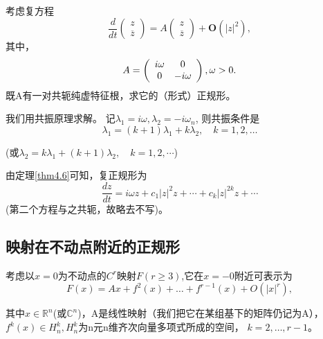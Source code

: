 \begin{example}
  考虑复方程
  \[
    \frac { d } { d t }
    \left(
      \begin{array} { l }
        { z } \\
        { \overline{z} }
      \end{array}
    \right)
    =    A \left(
      \begin{array} { l }
        { z } \\
        { \overline{z} }
      \end{array}
    \right)
  +\mathbf{O}\left(|z|^2\right),
\]
其中，
\[
  A = \left(
    \begin{array} { c c }
      { i \omega } & { 0 } \\
      { 0 } & { - i \omega }
    \end{array}
  \right),
  \omega > 0.
\]
既A有一对共轭纯虚特征根，求它的（形式）正规形。
\end{example}

\begin{solve}
  我们用共振原理求解。
  记$\lambda _ { 1 } = i \omega , \lambda _ { 2 } = - i \omega _ { n }$,
  则共振条件是
  \[
\lambda _ { 1 } = ( k + 1 ) \lambda _ { 1 } + k \lambda _ { 2 } , \quad k = 1,2 , \dots
\]

\begin{center}
(或$\lambda _ { 2 } = k \lambda _ { 1 } + ( k + 1 ) \lambda _ { 2 } , \quad k = 1,2 , \cdots$)
\end{center}
由定理\ref{thm4.6}可知，复正规形为
\begin{equation}
\frac { d z } { d t } = i \omega z + c _ { 1 } | z | ^ { 2 } z + \cdots + c _ { k } | z | ^ { 2k } z + \cdots
  \label{eq:1.4.22}
\end{equation}
(第二个方程与之共轭，故略去不写)。
\end{solve}

\subsection{映射在不动点附近的正规形}
考虑以\(x=0\)为不动点的\(C^r\)映射$F ( r \geq 3 )$,它在\(x=-0\)附近可表示为
\begin{equation}
F ( x ) = A x + f ^ { 2 } ( x ) + \dots + f ^ { r - 1 } ( x ) + O \left( | x | ^ { r } \right),
  \label{eq:1.4.23}
\end{equation}

其中\(x\in \mathbb{R}^n\)(或\(\mathbb{C}^n\))，A是线性映射（我们把它在某组基下的矩阵仍记为A），$f ^ { k } ( x ) \in H _ { n  } ^ { k } , H _ {  n  } ^ { k }$为n元n维齐次向量多项式所成的空间，
$k = 2 , \dots , r - 1$。

